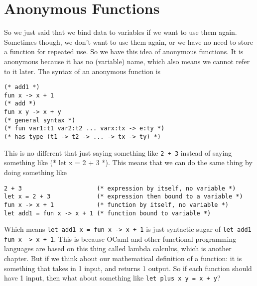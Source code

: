 \documentclass[main.tex]{subfiles}
\begin{document}
\section{Anonymous Functions}
So we just said that we bind data to variables if we want to use them again. Sometimes though, we don't want to use them again, or we have no need to store a function for repeated use. So we have this idea of anonymous functions. It is anonymous because it has no (variable) name, which also means we cannot refer to it later. The syntax of an anonymous function is 
\begin{lstlisting}[style=Myocamlstyle]
(* add1 *)
fun x -> x + 1
(* add *)
fun x y -> x + y
(* general syntax *)
(* fun var1:t1 var2:t2 ... varx:tx -> e:ty *)
(* has type (t1 -> t2 -> ... -> tx -> ty) *)
\end{lstlisting}
This is no different that just saying something like \texttt{2 + 3} instead of saying something like (* let x = 2 + 3 *). 
This means that we can do the same thing by doing something like 
\begin{lstlisting}[style=Myocamlstyle]
2 + 3                     (* expression by itself, no variable *)
let x = 2 + 3             (* expression then bound to a variable *)
fun x -> x + 1            (* function by itself, no variable *)
let add1 = fun x -> x + 1 (* function bound to variable *)
\end{lstlisting}
Which means \texttt{let add1 x = fun x -> x + 1} is just syntactic sugar  of \texttt{let add1 fun x -> x + 1}. 
This is because OCaml and other functional programming languages are based on this thing called lambda calculus, which is another chapter. 
But if we think about our mathematical definition of a function: it is something that takes in 1 input, and returns 1 output.
So if each function should have 1 input, then what about something like \texttt{let plus x y = x + y}? 
\end{document}
